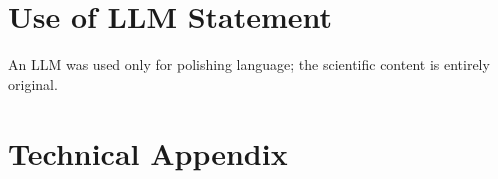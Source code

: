 \documentclass[11pt]{article}
\begin{document}


%


\appendix

\section{Use of LLM Statement} 
An LLM was used only for polishing language; the scientific content is entirely original.


\section{Technical Appendix}
\end{document}
